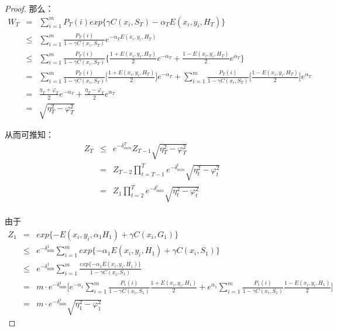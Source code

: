 \begin{proof}
那么：
\begin{equation}
    \begin{array}{lll}
       W_T & = & \sum\limits_{i=1}^m P_T(i) exp\{\gamma C(x_i, S_T) -\alpha_T E(x_i, y_i, H_T)\} \\
       & \le & \sum\limits_{i=1}^m  \frac{P_T(i)}{1 - \gamma C(x_i, S_T)} e^{-\alpha_T E(x_i, y_i, H_T)} \\
       & \le & \sum\limits_{i=1}^m  \frac{P_T(i)}{1 - \gamma C(x_i, S_T)} \bigg\{\frac{1+E(x_i,y_i,H_T)}{2} e^{-\alpha_T} + \frac{1-E(x_i,y_i,H_T)}{2} e^{\alpha_T} \bigg\} \\
       & = & \sum\limits_{i=1}^m \frac{P_T(i)}{1 - \gamma C(x_i, S_T)} \bigg[ \frac{1+E(x_i,y_i,H_T)}{2}\bigg] e^{-\alpha_T} + \sum\limits_{i=1}^m \frac{P_T(i)}{1 - \gamma C(x_i, S_T)} \bigg[ \frac{1-E(x_i,y_i,H_T)}{2}\bigg] e^{\alpha_T}\\
       & = & \frac{\eta_T + \varphi_T}{2} e^{-\alpha_T} + \frac{\eta_T - \varphi_T}{2} e^{\alpha_T} \\
       & = & \sqrt{\eta_T^2 - \varphi_T^2}
    \end{array}
\end{equation}

从而可推知：
\begin{equation}
    \begin{array}{lll}
       Z_T & \le &  e^{-\delta_{min}^T} Z_{T-1} \sqrt{\eta_T^2 - \varphi_T^2}\\
       & = & Z_{T-2} \prod\limits_{t=T-1}^T e^{-\delta_{min}^t} \sqrt{\eta_t^2 - \varphi_t^2} \\
       & = & Z_1 \prod\limits_{t=2}^T e^{-\delta_{min}^t} \sqrt{\eta_t^2 - \varphi_t^2} \\
    \end{array}
\end{equation}

由于
\begin{equation}
    \begin{array}{lll}
      Z_1 & = & exp\{-E(x_i,y_i, \alpha_1 H_1) + \gamma C(x_i, G_1)\} \\
       & \le & e^{-\delta_{\min}^1} \sum\limits_{i=1}^m exp\{-\alpha_1 E(x_i,y_i, H_1) + \gamma C(x_i, S_1)\} \\
       & \le & e^{-\delta_{\min}^1} \sum\limits_{i=1}^m \frac{exp\{-\alpha_1 E(x_i,y_i, H_1)\}}{1-\gamma C(x_i, S_1)} \\
       & = & m \cdot e^{-\delta_{\min}^1} \big[e^{-\alpha_1} \sum\limits_{i=1}^m \frac{P_1(i)}{1-\gamma C(x_i, S_1)} \frac{1+E(x_i,y_i,H_1)}{2} + e^{\alpha_1} \sum\limits_{i=1}^m \frac{P_1(i)}{1-\gamma C(x_i, S_1)} \frac{1-E(x_i,y_i,H_1)}{2}\big]\\
       & = & m \cdot e^{-\delta_{\min}^1} \sqrt{\eta_1^2 - \varphi_1^2}
    \end{array}
\end{equation}


\end{proof}
